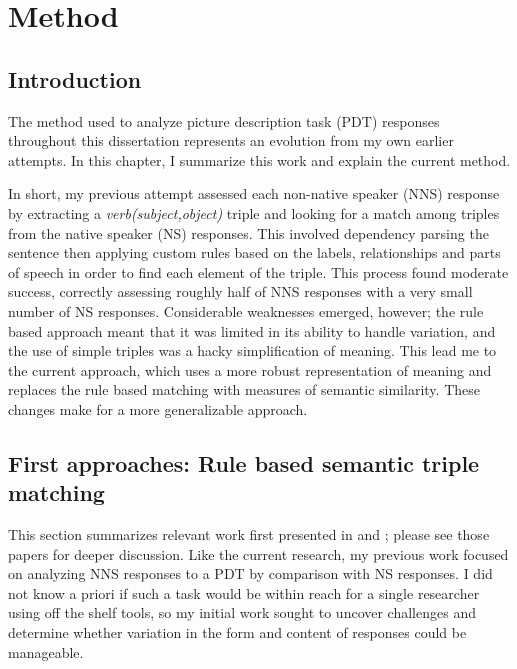 \chapter{Method}
\label{chap:method}
%
%
%
%
%
%
%
%
%
%
%
%
\section{Introduction}
The method used to analyze picture description task (PDT) responses throughout this dissertation represents an evolution from my own earlier attempts. In this chapter, I summarize this work and explain the current method.

In short, my previous attempt assessed each non-native speaker (NNS) response by extracting a \textit{verb(subject,object)} triple and looking for a match among triples from the native speaker (NS) responses. This involved dependency parsing the sentence then applying custom rules based on the labels, relationships and parts of speech in order to find each element of the triple. This process found moderate success, correctly assessing roughly half of NNS responses with a very small number of NS responses. Considerable weaknesses emerged, however; the rule based approach meant that it was limited in its ability to handle variation, and the use of simple triples was a hacky simplification of meaning. This lead me to the current approach, which uses a more robust representation of meaning and replaces the rule based matching with measures of semantic similarity. These changes make for a more generalizable approach.

\section{First approaches: Rule based semantic triple matching}
\label{sec:first-approaches}
This section summarizes relevant work first presented in \citet{king:dickinson:13} and \citet{king:dickinson:14}; please see those papers for deeper discussion. Like the current research, my previous work focused on analyzing NNS responses to a PDT by comparison with NS responses. I did not know a priori if such a task would be within reach for a single researcher using off the shelf tools, so my initial work sought to uncover challenges and determine whether variation in the form and content of responses could be manageable.

